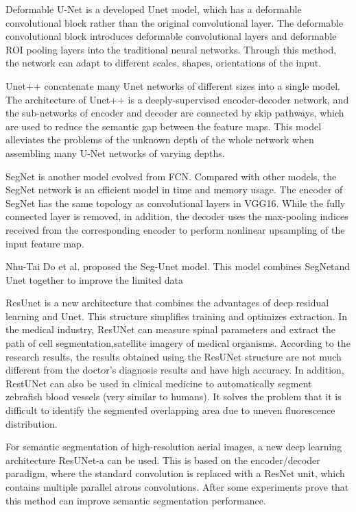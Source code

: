 \documentclass{article}
\begin{document}
Deformable U-Net is a developed Unet model, which has a deformable convolutional block rather than the original convolutional layer.
The deformable convolutional block introduces deformable convolutional layers and deformable ROI pooling layers into the traditional neural networks.
Through this method, the network can adapt to different scales, shapes, orientations of the input.\cite{jin2019dunet}

Unet++ concatenate many Unet networks of different sizes into a single model.
The architecture of Unet++ is a deeply-supervised encoder-decoder network, and the sub-networks of encoder and decoder are connected by skip pathways, which are used to reduce the semantic gap between the feature maps.\cite{DBLP:journals/corr/abs-1807-10165}
This model alleviates the problems of the unknown depth of the whole network when assembling many U-Net networks of varying depths.\cite{zhou2020unet}

SegNet is another model evolved from FCN.
Compared with other models, the SegNet network is an efficient model in time and memory usage.
The encoder of SegNet has the same topology as convolutional layers in VGG16.\cite{simonyan2014very}
While the fully connected layer is removed, in addition, the decoder uses the max-pooling indices received from the corresponding encoder to perform nonlinear upsampling of the input feature map.\cite{DBLP:journals/corr/BadrinarayananK15}

Nhu-Tai Do et al.\cite{do2019knee} proposed the Seg-Unet model. This model combines SegNetand Unet together to improve the limited data

ResUnet is a new architecture that combines the advantages of deep residual learning and Unet.\cite{zhang2018road}
This structure simplifies training and optimizes extraction. In the medical industry, ResUNet can measure spinal parameters\cite{weng2019artificial} and extract the path of cell segmentation\cite{lessmann2019iterative},satellite imagery of medical organisms.
According to the research results\cite{weng2019artificial}, the results obtained using the ResUNet structure are not much different from the doctor's diagnosis results and have high accuracy.
In addition, RestUNet can also be used in clinical medicine to automatically segment zebrafish blood vessels (very similar to humans). It solves the problem that it is difficult to identify the segmented overlapping area due to uneven fluorescence distribution.\cite{zhang2019zebrafish}

For semantic segmentation of high-resolution aerial images, a new deep learning architecture ResUNet-a can be used.
This is based on the encoder/decoder paradigm, where the standard convolution is replaced with a ResNet unit, which contains multiple parallel atrous convolutions.
After some experiments prove that this method can improve semantic segmentation performance.\cite{diakogiannis2020resunet}
\end{document}
